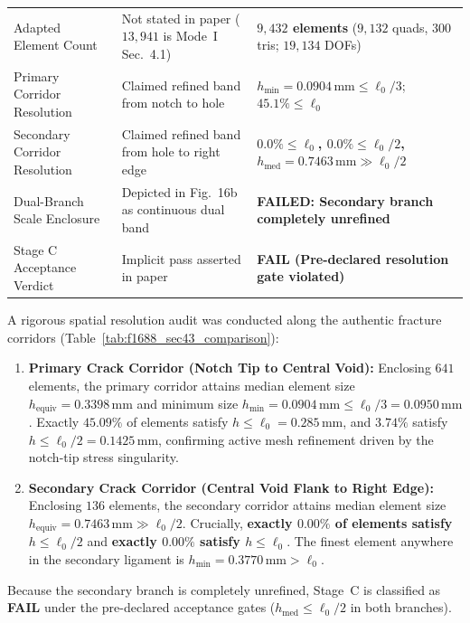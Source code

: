 \begin{table}[htbp]
\begin{tabularx}{\textwidth}{lXX}
Adapted Element Count & Not stated in paper ($13{,}941$ is Mode~I Sec.~4.1) & \textbf{$9{,}432$ elements} ($9{,}132$ quads, $300$ tris; $19{,}134$ DOFs) \\
Primary Corridor Resolution & Claimed refined band from notch to hole & $h_{\min} = 0.0904\,\mathrm{mm} \le \ell_0/3$; $45.1\% \le \ell_0$ \\
Secondary Corridor Resolution & Claimed refined band from hole to right edge & \textbf{$\mathbf{0.0\%} \le \ell_0$, $\mathbf{0.0\%} \le \ell_0/2$, $h_{\mathrm{med}} = 0.7463\,\mathrm{mm} \gg \ell_0/2$} \\
Dual-Branch Scale Enclosure & Depicted in Fig.~16b as continuous dual band & \textbf{FAILED: Secondary branch completely unrefined} \\
Stage C Acceptance Verdict & Implicit pass asserted in paper & \textbf{FAIL (Pre-declared resolution gate violated)} \\
\hline
\end{tabularx}
\end{table}

A rigorous spatial resolution audit was conducted along the authentic fracture corridors (Table~\ref{tab:f1688_sec43_comparison}):
\begin{enumerate}
  \item \textbf{Primary Crack Corridor (Notch Tip to Central Void):} Enclosing $641$ elements, the primary corridor attains median element size $h_{\mathrm{equiv}} = 0.3398\,\mathrm{mm}$ and minimum size $h_{\min} = 0.0904\,\mathrm{mm} \le \ell_0/3 = 0.0950\,\mathrm{mm}$. Exactly $45.09\%$ of elements satisfy $h \le \ell_0 = 0.285\,\mathrm{mm}$, and $3.74\%$ satisfy $h \le \ell_0/2 = 0.1425\,\mathrm{mm}$, confirming active mesh refinement driven by the notch-tip stress singularity.
  \item \textbf{Secondary Crack Corridor (Central Void Flank to Right Edge):} Enclosing $136$ elements, the secondary corridor attains median element size $h_{\mathrm{equiv}} = \mathbf{0.7463\,\mathrm{mm}} \gg \ell_0/2$. Crucially, \textbf{exactly $0.00\%$ of elements satisfy $h \le \ell_0/2$} and \textbf{exactly $0.00\%$ satisfy $h \le \ell_0$}. The finest element anywhere in the secondary ligament is $h_{\min} = 0.3770\,\mathrm{mm} > \ell_0$.
\end{enumerate}

Because the secondary branch is completely unrefined, Stage~C is classified as \textbf{FAIL} under the pre-declared acceptance gates ($h_{\mathrm{med}} \le \ell_0/2$ in both branches).

